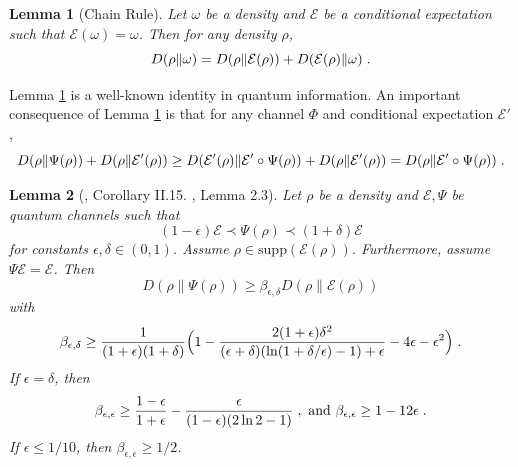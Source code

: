 \documentclass[11pt,reqno]{amsart}
\newtheorem{lemma}{Lemma}[section]
\newcommand{\E}{\mathcal{E}}
\newcommand{\pl}{\hspace{.1cm}}
\begin{document}
\begin{lemma}[Chain Rule] \label{lem:chainexp}
Let $\omega$ be a density and $\E$ be a conditional expectation such that $\E(\omega) = \omega$. Then for any density $\rho$,
\begin{equation*}
D(\rho \| \omega) = D(\rho \| \E(\rho)) + D(\E(\rho) \| \omega) \pl.
\end{equation*}
\end{lemma}
Lemma \ref{lem:chainexp} is a well-known identity in quantum information. An important consequence of Lemma \ref{lem:chainexp} is that for any channel $\Phi$ and conditional expectation $\E'$,
\begin{equation} \label{eq:chain-iter}
    D(\rho \|\Psi(\rho)) + D(\rho \| \E'(\rho))
        \geq D(\E'(\rho) \| \E' \circ \Psi(\rho)) + D(\rho \| \E'(\rho))
    = D(\rho \| \E' \circ \Psi(\rho)) \pl.
\end{equation}
\begin{lemma}[\cite{laracuente_quasi-factorization_2022}, Corollary II.15. \cite{gao_complete_2025}, Lemma 2.3]  \label{lem:revconv}
Let $\rho$ be a density and $\E,\Psi$ be quantum channels such that
\begin{equation}
    (1 - \epsilon) \E \prec \Psi(\rho) \prec (1 + \delta) \E
\end{equation}
for constants $\epsilon, \delta \in (0,1)$. Assume $\rho \in \text{supp}(\E(\rho))$. Furthermore, assume $\Psi \E = \E$. Then
\begin{equation}
D(\rho \| \Psi(\rho)) \geq \beta_{\epsilon, \delta} D(\rho \| \E(\rho))
\end{equation}
with
\begin{equation} \label{eq:simpleG} 
    \beta_{\epsilon, \delta} \geq \frac{1}{{(1 + \epsilon)(1 + \delta)}} \Big ( 1 - \frac{2 (1 + \epsilon) \delta^2}{(\epsilon + \delta)(\ln (1 + \delta / \epsilon) - 1) + \epsilon} - 4 \epsilon - \epsilon^2 \Big ) \pl.
\end{equation}
If $\epsilon = \delta$, then
\begin{equation}
    \beta_{\epsilon, \epsilon} \geq \frac{1-\epsilon}{1 + \epsilon} - \frac{\epsilon}{(1 - \epsilon) (2 \ln 2 - 1)} \pl, \text{ and } \beta_{\epsilon, \epsilon} \geq 1 - 12 \epsilon \pl.
\end{equation}
If $\epsilon \leq 1/10$, then $\beta_{\epsilon, \epsilon} \geq 1/2$.
\end{lemma}
\end{document}
